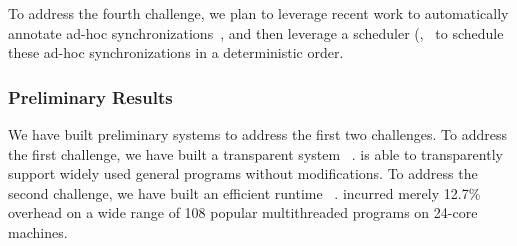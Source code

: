 To address the fourth challenge, we plan to leverage recent work to 
automatically annotate ad-hoc synchronizations~\cite{syncfinder:osdi10, 
cfix:osdi12}, and then leverage a \dmt scheduler (\eg,~\cite{dthreads:sosp11, 
parrot:sosp13} to schedule these ad-hoc synchronizations in a deterministic 
order.









\vspace{-.15in}\subsubsection{Preliminary Results} 
\label{sec:defense-result}\vspace{-.075in}

We have built preliminary systems to address the first two challenges. To 
address the first challenge, we have built a transparent \smr system 
\crane~\cite{crane:sosp15}. \crane is able to transparently support widely used 
general programs without modifications. To address the second challenge, we have 
built an efficient \dmt runtime \parrot~\cite{parrot:sosp13}. \parrot incurred 
merely 12.7\% overhead on a wide range of 108 popular multithreaded programs on 
24-core machines.

